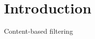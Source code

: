 \documentclass[10pt,oneside,english,a4paper]{article}
\begin{document}
\newpage{} 
\tableofcontents

\newpage{} 
\section{Introduction}

Content-based filtering\cite{5197422}








\clearpage 
\normalsize 
 
 
\nocite{*}
\end{document}
